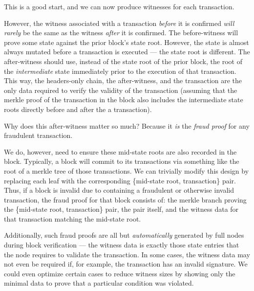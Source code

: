 This is a good start, and we can now produce witnesses for each transaction.

However, the witness associated with a transaction \emph{before} it is confirmed \emph{will rarely} be the same as the witness \emph{after} it is confirmed.
The before-witness will prove some state against the prior block's state root.
However, the state is almost always mutated before a transaction is executed --- the state root is different.
The after-witness should use, instead of the state root of the prior block, the root of the \emph{intermediate} state immediately prior to the execution of that transaction.
This way, the headers-only chain, the after-witness, and the transaction are the only data required to verify the validity of the transaction (assuming that the merkle proof of the transaction in the block also includes the intermediate state roots directly before and after the a transaction).

Why does this after-witness matter so much?
Because it \emph{is} the \emph{fraud proof} for any fraudulent transaction.


We do, however, need to ensure these mid-state roots are also recorded in the block.
Typically, a block will commit to its transactions via something like the root of a merkle tree of those transactions.
We can trivially modify this design by replacing each leaf with the corresponding \{mid-state root, transaction\} pair.
Thus, if a block is invalid due to containing a fraudulent or otherwise invalid transaction, the fraud proof for that block consists of: the merkle branch proving the \{mid-state root, transaction\} pair, the pair itself, and the witness data for that transaction matching the mid-state root.

Additionally, such fraud proofs are all but \emph{automatically} generated by full nodes during block verification --- the witness data is exactly those state entries that the node requires to validate the transaction.
In some cases, the witness data may not even be required if, for example, the transaction has an invalid signature.
We could even optimize certain cases to reduce witness sizes by showing only the minimal data to prove that a particular condition was violated.



